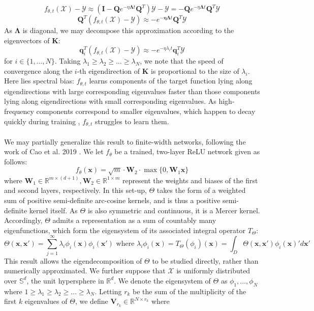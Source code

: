 \documentclass[11pt]{article}
\newcommand{\R}{\mathbb{R}}
\newcommand{\X}{\mathcal{X}}
\newcommand{\Y}{\mathcal{Y}}
\begin{document}
$$f_{\theta, t}(\X) - \Y \approx (\mathbf{I} - \mathbf{Q}e^{-\eta\mathbf{\Lambda} t}\mathbf{Q}^T) \Y - \Y = - \mathbf{Q}e^{-\eta\mathbf{\Lambda} t}\mathbf{Q}^T \Y$$
$$\mathbf{Q}^T(f_{\theta, t}(\X) - \Y) \approx -e^{-\mathbf{\eta\Lambda} t}\mathbf{Q}^T \Y$$
As $\mathbf{\Lambda}$ is diagonal, we may decompose this approximation according to the eigenvectors of $\mathbf{K}$:
$$\mathbf{q}_i^T(f_{\theta, t}(\X) - \Y) \approx -e^{-\eta\lambda_i t}\mathbf{q}_i^T\Y$$
for $i \in \{1, \dots, N\}$. Taking $\lambda_1 \ge \lambda_2 \ge \dots \ge \lambda_N$, we note that the speed of convergence along the $i$-th eigendirection of $\mathbf{K}$ is proportional to the size of $\lambda_i$. Here lies spectral bias: $f_{\theta, t}$ learns components of the target function lying along eigendirections with large corresponding eigenvalues faster than those components lying along eigendirections with small corresponding eigenvalues. As high-frequency components correspond to smaller eigenvalues, which happen to decay quickly during training \cite{Decay}, $f_{\theta, t}$ struggles to learn them.\\
\\
We may partially generalize this result to finite-width networks, following the work of Cao et al. 2019 \cite{Cao21}. We let $f_\theta$ be a trained, two-layer ReLU network given as follows:
$$f_\theta(\mathbf{x}) = \sqrt{m} \cdot \mathbf{W}_2 \cdot \max\{0, \mathbf{W}_1\mathbf{x}\}$$
where $\mathbf{W}_1 \in \R^{m \times (d + 1)}, \mathbf{W}_2 \in \R^{1 \times m}$ represent the weights and biases of the first and second layers, respectively. In this set-up, $\Theta$ takes the form of a weighted sum of positive semi-definite arc-cosine kernels, and is thus a positive semi-definite kernel itself. As $\Theta$ is also symmetric and continuous, it is a Mercer kernel. Accordingly, $\Theta$ admits a representation as a sum of countably many eigenfunctions, which form the eigensystem of its associated integral operator $T_{\Theta}$:
$$\Theta(\mathbf{x}, \mathbf{x}') = \sum_{j = 1}^{\infty}\lambda_i\phi_i(\mathbf{x})\phi_i(\mathbf{x}') \text{  where  } \lambda_i\phi_i(\mathbf{x}) = T_\Theta(\phi_i)(\mathbf{x}) = \int_{D}\Theta(\mathbf{x}, \mathbf{x}')\phi_i(\mathbf{x})'d\mathbf{x}'$$
This result allows the eigendecomposition of $\Theta$ to be studied directly, rather than numerically approximated. We further suppose that $\X$ is uniformly distributed over $\mathbb{S}^d$, the unit hypersphere in $\R^d$. We denote the eigensystem of $\Theta$ as $\phi_{1}, \dots, \phi_N$ where $1 \ge \lambda_1 \ge \lambda_2 \ge \dots \ge \lambda_N$. Letting $r_k$ be the sum of the multiplicity of the first $k$ eigenvalues of $\Theta$, we define $\mathbf{V}_{r_k} \in \R^{N \times r_k}$ where
\end{document}
